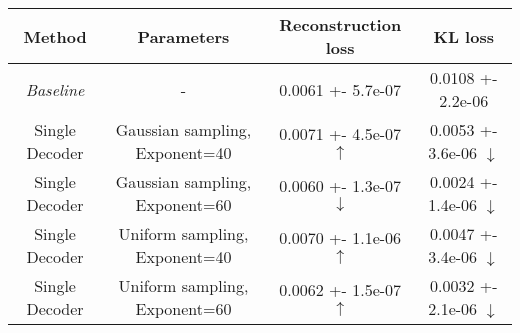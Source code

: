 \centering
\scriptsize
\begin{tabular}{||c|c|c|c||}
\hline
 Method & Parameters & Reconstruction loss & KL loss \\
\hline
\textit{Baseline} & - & 0.0061 +- 5.7e-07 & 0.0108 +- 2.2e-06 \\
\hline
Single Decoder & Gaussian sampling, Exponent=40 & 0.0071 +- 4.5e-07  $\uparrow$ & 0.0053 +- 3.6e-06  $\downarrow$ \\
\hline
Single Decoder & Gaussian sampling, Exponent=60 & 0.0060 +- 1.3e-07  $\downarrow$ & 0.0024 +- 1.4e-06  $\downarrow$ \\
\hline
Single Decoder & Uniform sampling, Exponent=40 & 0.0070 +- 1.1e-06  $\uparrow$ & 0.0047 +- 3.4e-06  $\downarrow$ \\
\hline
Single Decoder & Uniform sampling, Exponent=60 & 0.0062 +- 1.5e-07  $\uparrow$ & 0.0032 +- 2.1e-06  $\downarrow$ \\
\hline
\end{tabular}
